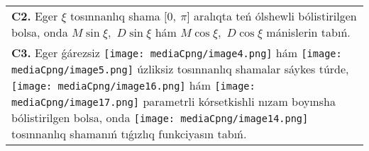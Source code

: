 \documentclass{article}
\begin{document}
\begin{tabular}{m{17cm}}
 \\
\textbf{C2.} Eger \(\xi\) tosınnanlıq shama \(\lbrack 0,\ \pi\rbrack\) aralıqta teń ólshewli bólistirilgen bolsa, onda \(M\sin\xi,\) \(D\sin\xi\) hám \(M\cos\xi,\) \(D\cos\xi\) mánislerin tabıń.
 \\
\textbf{C3.} Eger ǵárezsiz \texttt{[image: mediaCpng/image4.png]} hám \texttt{[image: mediaCpng/image5.png]} úzliksiz tosınnanlıq shamalar sáykes túrde, \texttt{[image: mediaCpng/image16.png]} hám \texttt{[image: mediaCpng/image17.png]} parametrli kórsetkishli nızam boyınsha bólistirilgen bolsa, onda \texttt{[image: mediaCpng/image14.png]} tosınnanlıq shamanıń tıǵızlıq funkciyasın tabıń.
 \\

\end{tabular}
\vspace{1cm}
\end{document}
